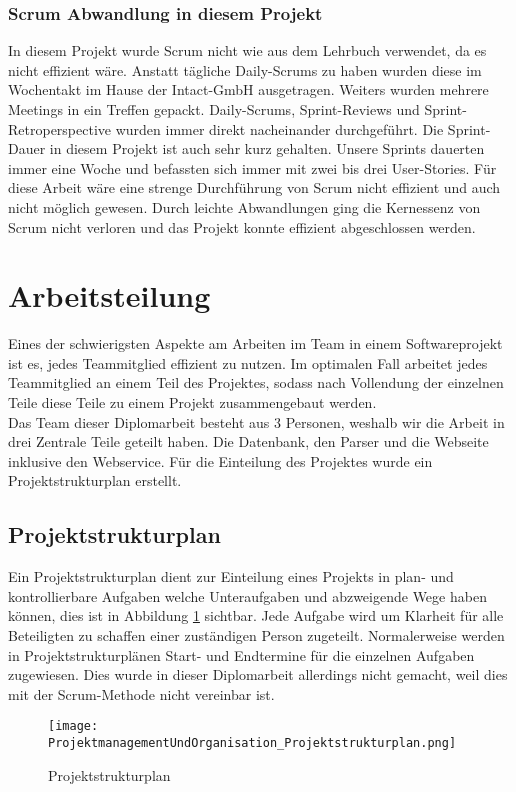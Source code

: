 \subsubsection{Scrum Abwandlung in diesem Projekt}
\label{sec:ScrumAbwandlungInDiesemProjekt}
In diesem Projekt wurde Scrum nicht wie aus dem Lehrbuch verwendet, da es nicht effizient wäre. Anstatt tägliche Daily-Scrums zu haben wurden diese im Wochentakt im Hause der Intact-GmbH ausgetragen. Weiters wurden mehrere Meetings in ein Treffen gepackt. Daily-Scrums, Sprint-Reviews und Sprint-Retroperspective wurden immer direkt nacheinander durchgeführt. Die Sprint-Dauer in diesem Projekt ist auch sehr kurz gehalten. Unsere Sprints dauerten immer eine Woche und befassten sich immer mit zwei bis drei User-Stories. Für diese Arbeit wäre eine strenge Durchführung von Scrum nicht effizient und auch nicht möglich gewesen. Durch leichte Abwandlungen ging die Kernessenz von Scrum nicht verloren und das Projekt konnte effizient abgeschlossen werden.

\section{Arbeitsteilung}
\label{ref:Arbeitsteilung}
Eines der schwierigsten Aspekte am Arbeiten im Team in einem Softwareprojekt ist es, jedes Teammitglied effizient zu nutzen. Im optimalen Fall arbeitet jedes Teammitglied an einem Teil des Projektes, sodass nach Vollendung der einzelnen Teile diese Teile zu einem Projekt zusammengebaut werden.\\
Das Team dieser Diplomarbeit besteht aus 3 Personen, weshalb wir die Arbeit in drei Zentrale Teile geteilt haben. Die Datenbank, den Parser und die Webseite inklusive den Webservice. Für die Einteilung des Projektes wurde ein Projektstrukturplan erstellt.

\subsection{Projektstrukturplan}
\label{ref:Projektstrukturplan}
Ein Projektstrukturplan dient zur Einteilung eines Projekts in plan- und kontrollierbare Aufgaben welche Unteraufgaben und abzweigende Wege haben können, dies ist in Abbildung \ref{fig:projektStrukturplan} sichtbar. Jede Aufgabe wird um Klarheit für alle Beteiligten zu schaffen einer zuständigen Person zugeteilt. Normalerweise werden in Projektstrukturplänen Start- und Endtermine für die einzelnen Aufgaben zugewiesen. Dies wurde in dieser Diplomarbeit allerdings nicht gemacht, weil dies mit der Scrum-Methode nicht vereinbar ist.
\begin{figure}[H]
	\texttt{[image: ProjektmanagementUndOrganisation\_Projektstrukturplan.png]}
    \caption{Projektstrukturplan}
    \label{fig:projektStrukturplan}
\end{figure}

